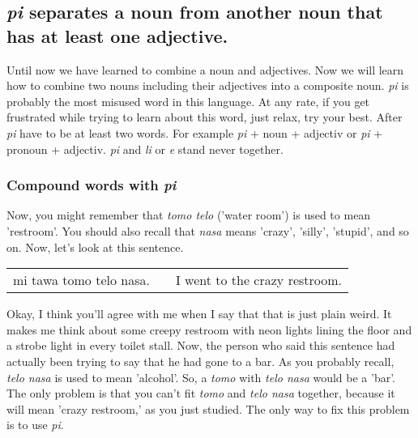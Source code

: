 \subsection*{\textit{pi} separates a noun from another noun that has at least one adjective.}

Until now we have learned to combine a noun and adjectives. 
Now we will learn how to combine two nouns including their adjectives into a composite noun. 
\textit{pi} is probably the most misused word in this language. 
At any rate, if you get frustrated while trying to learn about this word, just relax, try your best. 
After \textit{pi} have to be at least two words. 
For example \textit{pi} + noun + adjectiv or \textit{pi} + pronoun + adjectiv. 
\textit{pi} and \textit{li} or \textit{e} stand never together.
%
\subsubsection*{Compound words with \textit{pi}} 
%
Now, you might remember that \textit{tomo telo} ('water room') is used to mean 'restroom'. 
You should also recall that \textit{nasa} means 'crazy', 'silly', 'stupid', and so on. 
Now, let's look at this sentence.

\begin{supertabular}{p{5,5cm}|ll}
mi tawa tomo telo nasa. && I went to the crazy restroom. \\ %
\end{supertabular}  

Okay, I think you'll agree with me when I say that that is just plain weird. 
It makes me think about some creepy restroom with neon lights lining the floor and a strobe light in every toilet stall. 
Now, the person who said this sentence had actually been trying to say that he had gone to a bar. 
As you probably recall, \textit{telo nasa} is used to mean 'alcohol'. 
So, a \textit{tomo} with \textit{telo nasa} would be a 'bar'. 
The only problem is that you can't fit \textit{tomo} and \textit{telo nasa} together, because it will mean 'crazy restroom,' as you just studied. 
The only way to fix this problem is to use \textit{pi}.


